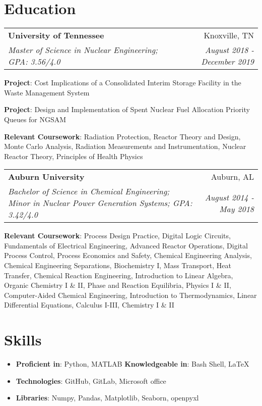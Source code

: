 \documentclass[letterpaper,10pt]{article}
\makeatletter
\newcommand{\resumeItemNoBullet}[2]{
  \item[]\small{
    \hspace{-9pt}\textbf{#1}{: #2 \vspace{-6pt}}
  }
}
\newcommand{\resumeSubheading}[4]{
  \vspace{-1pt}\item[]
  \begin{tabular*}{0.98\textwidth}{l@{\extracolsep{\fill}}r}
      \hspace{-10pt}\textbf{#1} & #2 \\
      \hspace{-10pt}\textit{\small#3} & \textit{\small #4} \\
    \end{tabular*}\vspace{-5pt}
}
\newcommand{\resumeSubHeadingListStart}{\begin{itemize}[leftmargin=*]}
\newcommand{\resumeSubHeadingListEnd}{\end{itemize}}
\newcommand{\shorterSection}[1]{\vspace{-10pt}\section{#1}}
\makeatother
\begin{document}
\shorterSection{Education}
  \resumeSubHeadingListStart
    \resumeSubheading
      {University of Tennessee}{Knoxville, TN}
      {Master of Science in Nuclear Engineering;  GPA: 3.56/4.0}{August 2018 - December 2019}{
      \resumeItemNoBullet{Project}{Cost Implications of a Consolidated Interim Storage Facility in the Waste Management System}
      \resumeItemNoBullet{Project}{Design and Implementation of Spent Nuclear Fuel Allocation Priority Queues for NGSAM}
      \resumeItemNoBullet{Relevant Coursework}{Radiation Protection, Reactor Theory and Design, Monte Carlo Analysis, Radiation Measurements and Instrumentation,
      Nuclear Reactor Theory, Principles of Health Physics}
      }
    \resumeSubheading
      {Auburn University}{Auburn, AL}
      {Bachelor of Science in Chemical Engineering; Minor in Nuclear Power Generation Systems;  GPA: 3.42/4.0 }{August 2014 - May 2018}
       \resumeItemNoBullet{Relevant Coursework}{Process Design Practice, Digital Logic Circuits, Fundamentals of Electrical Engineering, Advanced Reactor Operations, Digital Process Control, Process Economics and Safety, Chemical Engineering Analysis, Chemical Engineering Separations, Biochemistry I, Mass Transport, Heat Transfer, Chemical Reaction Engineering, Introduction to Linear Algebra, Organic Chemistry I \& II, Phase and Reaction Equilibria, Physics I \& II, Computer-Aided Chemical Engineering, Introduction to Thermodynamics, Linear Differential Equations, Calculus I-III, Chemistry I \& II}
  \resumeSubHeadingListEnd

\shorterSection{Skills}
  \resumeSubHeadingListStart
  \small
    \item{
     \textbf{Proficient in}{: Python, MATLAB}
     \hfill
     \textbf{Knowledgeable in}{: Bash Shell, LaTeX}
    }
    \vspace{-5pt}
    \item{
    \textbf{Technologies}{: GitHub, GitLab, Microsoft office}
    }
    \vspace{-5pt}
    \item{
     \textbf{Libraries}{: Numpy, Pandas, Matplotlib, Seaborn, openpyxl}
    }
\resumeSubHeadingListEnd
\end{document}

